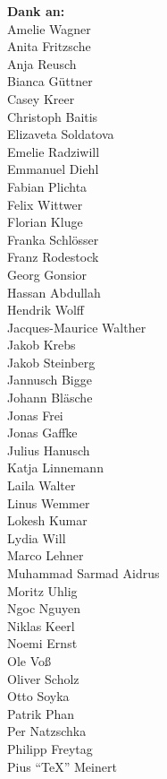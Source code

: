 \begin{minipage}[t][\textheight][b]{.25\textwidth}
\fontsize{6pt}{7.2pt}\selectfont
\raggedleft
\textbf{Dank an:}\\[1\baselineskip]
Amelie Wagner\\
Anita Fritzsche\\
Anja Reusch\\
Bianca Güttner\\
Casey Kreer\\
Christoph Baitis\\
Elizaveta Soldatova\\
Emelie Radziwill\\
Emmanuel Diehl\\
Fabian Plichta\\
Felix Wittwer\\
Florian Kluge\\
Franka Schlösser\\
Franz Rodestock\\
Georg Gonsior\\
Hassan Abdullah\\
Hendrik Wolff\\
Jacques-Maurice Walther\\
Jakob Krebs\\
Jakob Steinberg\\
Jannusch Bigge\\
Johann Bläsche\\
Jonas Frei\\
Jonas Gaffke\\
Julius Hanusch\\
Katja Linnemann\\
Laila Walter\\
Linus Wemmer\\
Lokesh Kumar\\
Lydia Will\\
Marco Lehner\\
Muhammad Sarmad Aidrus\\
Moritz Uhlig\\
Ngoc Nguyen\\
Niklas Keerl\\
Noemi Ernst\\
Ole Voß\\
Oliver Scholz\\
Otto Soyka\\
Patrik Phan\\
Per Natzschka\\
Philipp Freytag\\
Pius \foreignlanguage{english}{\enquote{\TeX}} Meinert\\

\end{minipage}
